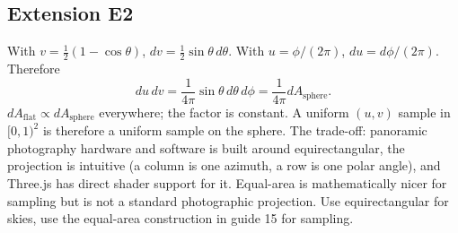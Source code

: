 \documentclass{article}
\begin{document}
\subsection*{Extension E2}
With $v = \tfrac{1}{2}(1 - \cos\theta)$, $dv = \tfrac{1}{2}\sin\theta \, d\theta$.
With $u = \phi/(2\pi)$, $du = d\phi/(2\pi)$. Therefore
\[
  du \, dv = \frac{1}{4\pi} \sin\theta \, d\theta \, d\phi = \frac{1}{4\pi} dA_{\text{sphere}}.
\]
$dA_{\text{flat}} \propto dA_{\text{sphere}}$ everywhere; the factor is
constant. A uniform $(u, v)$ sample in $[0, 1)^2$ is therefore a uniform
sample on the sphere. The trade-off: panoramic photography hardware and
software is built around equirectangular, the projection is intuitive (a
column is one azimuth, a row is one polar angle), and Three.js has direct
shader support for it. Equal-area is mathematically nicer for sampling but
is not a standard photographic projection. Use equirectangular for skies,
use the equal-area construction in guide 15 for sampling.
\end{document}
